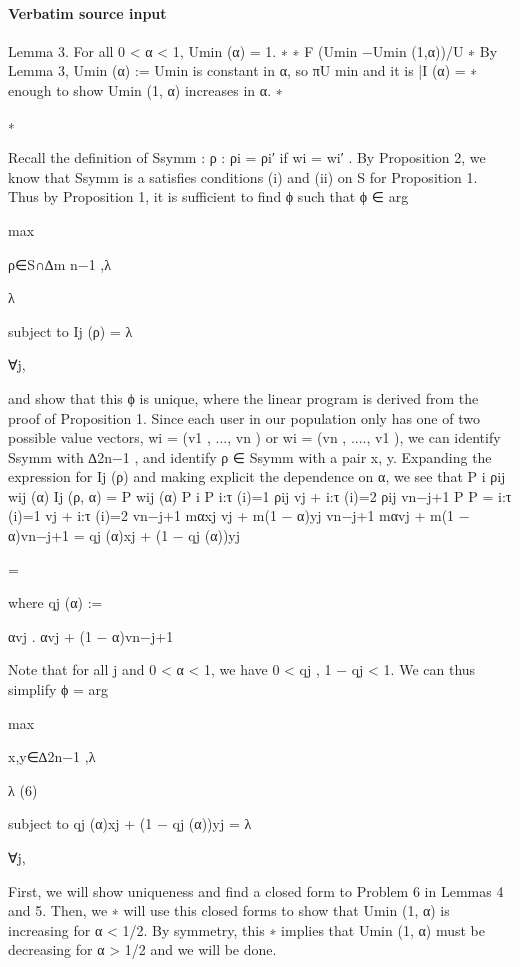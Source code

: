 \documentclass[10pt]{article}
\begin{document}
\paragraph{Verbatim source input}
\begin{ReviewVerbatim}
Lemma 3. For all 0 < α < 1, Umin
(α) = 1.
∗
∗
F
(Umin −Umin (1,α))/U ∗
By Lemma 3, Umin
(α) := Umin
is constant in α, so πU
min and it is
|I (α) =
∗
enough to show Umin (1, α) increases in α.
∗

∗

Recall the definition of Ssymm :
{ρ : ρi = ρi′ if wi = wi′ }.
By Proposition 2, we know that Ssymm is a satisfies conditions (i) and (ii) on S for Proposition 1.
Thus by Proposition 1, it is sufficient to find ϕ such that
ϕ ∈ arg

max

ρ∈S∩∆m
n−1 ,λ

λ

subject to Ij (ρ) = λ

∀j,

and show that this ϕ is unique, where the linear program is derived from the proof of Proposition 1.
Since each user in our population only has one of two possible value vectors, wi = (v1 , ..., vn )
or wi = (vn , ...., v1 ), we can identify Ssymm with ∆2n−1 , and identify ρ ∈ Ssymm with a pair x, y.
Expanding the expression for Ij (ρ) and making explicit the dependence on α, we see that
P
i ρij wij (α)
Ij (ρ, α) = P
wij (α)
P i
P
i:τ (i)=1 ρij vj +
i:τ (i)=2 ρij vn−j+1
P
P
=
i:τ (i)=1 vj +
i:τ (i)=2 vn−j+1
mαxj vj + m(1 − α)yj vn−j+1
mαvj + m(1 − α)vn−j+1
= qj (α)xj + (1 − qj (α))yj

=

where
qj (α) :=

αvj
.
αvj + (1 − α)vn−j+1

Note that for all j and 0 < α < 1, we have 0 < qj , 1 − qj < 1. We can thus simplify
ϕ = arg

max

x,y∈∆2n−1 ,λ

λ
(6)

subject to qj (α)xj + (1 − qj (α))yj = λ

∀j,

First, we will show uniqueness and find a closed form to Problem 6 in Lemmas 4 and 5. Then, we
∗
will use this closed forms to show that Umin
(1, α) is increasing for α < 1/2. By symmetry, this
∗
implies that Umin
(1, α) must be decreasing for α > 1/2 and we will be done.
\end{ReviewVerbatim}
\end{document}
